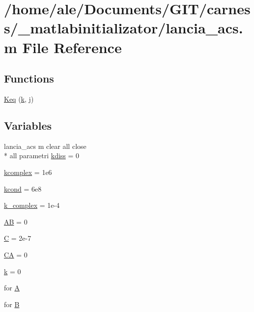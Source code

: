 \hypertarget{a00063}{\section{/home/ale/\-Documents/\-G\-I\-T/carness/\-\_\-matlabinitializator/lancia\-\_\-acs.m File Reference}
\label{a00063}
}
\subsection*{Functions}
\begin{DoxyCompactItemize}
\item 
\hyperlink{a00063_af7113c457c6779161b052400fad75b12}{Keq} (\hyperlink{a00062_abf70355c2e58f64c6b18bda1b9bccfd7}{k}, \hyperlink{a00062_ac86694252f8dfdb19aaeadc4b7c342c6}{j})
\end{DoxyCompactItemize}
\subsection*{Variables}
\begin{DoxyCompactItemize}
\item 
lancia\-\_\-acs m clear all close \\*
all parametri \hyperlink{a00063_aa3a014475bd24120996191acceaa4f3d}{kdiss} = 0
\item 
\hyperlink{a00063_a9cf172af920b969c5411ac19e5e13e22}{kcomplex} = 1e6
\item 
\hyperlink{a00063_af49f64b0687f4e269a7dc8e56ca82772}{kcond} = 6e8
\item 
\hyperlink{a00063_ad821064ff58d369f2a880dc5bf3db527}{k\-\_\-complex} = 1e-\/4
\item 
\hyperlink{a00063_abfef5bcdab19147dbfbb68112da17044}{A\-B} = 0
\item 
\hyperlink{a00063_aaa53ca0b650dfd85c4f59fa156f7a2cc}{C} = 2e-\/7
\item 
\hyperlink{a00063_afb377083e62f3bde1716905353335a78}{C\-A} = 0
\item 
\hyperlink{a00063_adc468c70fb574ebd07287b38d0d0676d}{k} = 0
\item 
for \hyperlink{a00063_ab4f8a2431d9ad6efec44b47971737c52}{A}
\item 
for \hyperlink{a00063_afb39b9efa52a33745c5e622fa358a97f}{B}
\end{DoxyCompactItemize}


